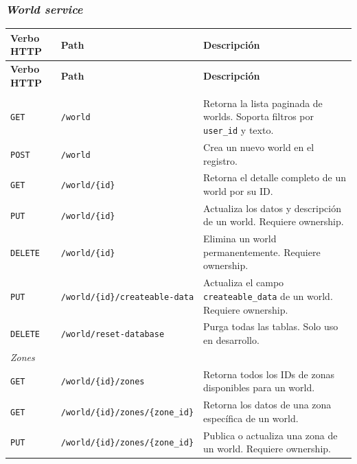\subsubsection{\textit{World service}}

\renewcommand{\arraystretch}{1.4}
\begin{longtable}{|p{2cm}|p{7cm}|p{5.5cm}|}
\hline
\textbf{Verbo HTTP} & \textbf{Path} & \textbf{Descripción} \\
\hline
\endfirsthead

\hline
\textbf{Verbo HTTP} & \textbf{Path} & \textbf{Descripción} \\
\hline
\endhead

\endfoot

\multicolumn{3}{|l|}{\textit{Worlds}} \\
\hline
\texttt{GET}    & \texttt{/world}                                & Retorna la lista paginada de worlds. Soporta filtros por \texttt{user\_id} y texto. \\
\hline
\texttt{POST}   & \texttt{/world}                                & Crea un nuevo world en el registro. \\
\hline
\texttt{GET}    & \texttt{/world/\{id\}}                         & Retorna el detalle completo de un world por su ID. \\
\hline
\texttt{PUT}    & \texttt{/world/\{id\}}                         & Actualiza los datos y descripción de un world. Requiere ownership. \\
\hline
\texttt{DELETE} & \texttt{/world/\{id\}}                         & Elimina un world permanentemente. Requiere ownership. \\
\hline
\texttt{PUT}    & \texttt{/world/\{id\}/createable-data}         & Actualiza el campo \texttt{createable\_data} de un world. Requiere ownership. \\
\hline
\texttt{DELETE} & \texttt{/world/reset-database}                 & Purga todas las tablas. Solo uso en desarrollo. \\
\hline
\multicolumn{3}{|l|}{\textit{Zones}} \\
\hline
\texttt{GET}    & \texttt{/world/\{id\}/zones}                   & Retorna todos los IDs de zonas disponibles para un world. \\
\hline
\texttt{GET}    & \texttt{/world/\{id\}/zones/\{zone\_id\}}      & Retorna los datos de una zona específica de un world. \\
\hline
\texttt{PUT}    & \texttt{/world/\{id\}/zones/\{zone\_id\}}      & Publica o actualiza una zona de un world. Requiere ownership. \\

\end{longtable}
